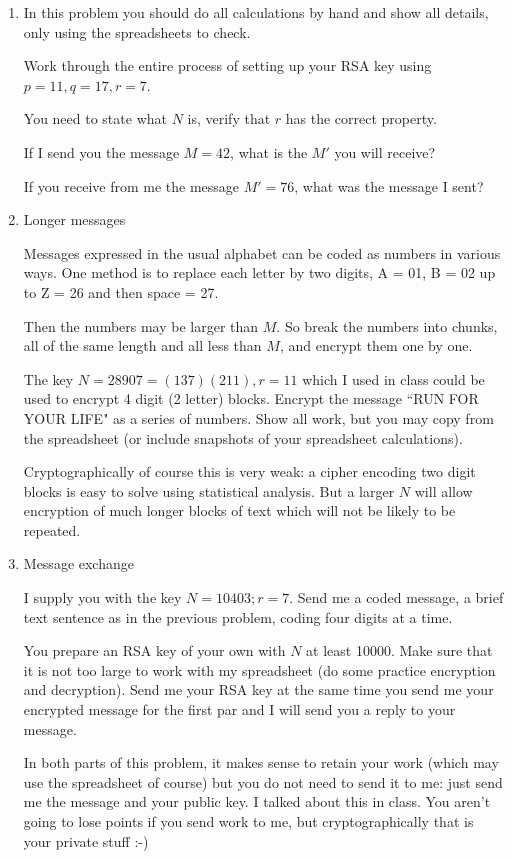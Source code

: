 \documentclass[12pt]{article}
\begin{document}
\begin{enumerate}

\item  In this problem you should do all calculations by hand and show all details, only using the spreadsheets to check.

Work through the entire process of setting up your RSA key using $p=11, q = 17, r = 7$.

You need to state what $N$ is, verify that $r$ has the correct property.

If I send you the message $M=42$, what is the $M'$ you will receive?

If you receive from me the message $M' =76$, what was the message I sent?

\item Longer messages

Messages expressed in the usual alphabet can be coded as numbers in various ways.  One method
is to replace each letter by two digits, A = 01, B = 02 up to Z = 26 and then space = 27.

Then the numbers may be larger than $M$.  So break the numbers into chunks, all of the same length
and all less than $M$, and encrypt them one by one.

The key $N=28907 = (137)(211), r=11$ which I used in class could be used to encrypt 4 digit (2 letter) blocks.
Encrypt the message ``RUN FOR YOUR LIFE" as a series of numbers.  Show all work, but you
may copy from the spreadsheet (or include snapshots of your spreadsheet calculations).

Cryptographically of course this is very weak:  a cipher encoding two digit blocks is easy to solve using statistical analysis.  But a larger $N$ will allow encryption of much longer blocks of text which will not be likely to be repeated.



\item Message exchange

I supply you with the key $N=10403; r=7$.  Send me a coded message, a brief text sentence as in the previous problem,
coding four digits at a time.

You prepare an RSA key of your own with $N$ at least 10000.  Make sure that it is not too large to work 
with my spreadsheet (do some practice encryption and decryption).  Send me your RSA key at the same time you send me your encrypted message for the first par and I will send you a reply to your message.

In both parts of this problem, it makes sense to retain your work (which may use the spreadsheet of course) but you do not need to send it to me:  just send me the message and your public key.  I talked about this in class.  You aren't going to lose points if you send work to me, but cryptographically that is your private stuff :-)


\end{enumerate}
\end{document}
